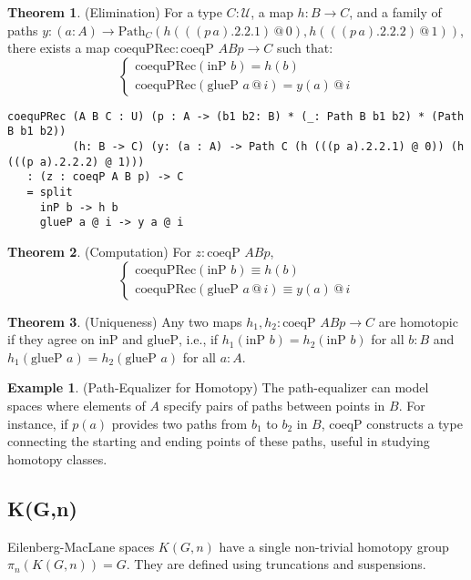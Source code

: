 \documentclass{article}
\theoremstyle{definition}
\newtheorem{theorem}{Theorem}
\newtheorem{example}{Example}
\begin{document}
\begin{theorem} (Elimination)
For a type $C : \mathcal{U}$, a map $h : B \to C$, and a family of paths $y : (a : A) \to \text{Path}_C (h (((p \, a).2.2.1) \, @ \, 0), h (((p \, a).2.2.2) \, @ \, 1))$, there exists a map $\text{coequPRec} : \text{coeqP } A B p \to C$ such that:
\[
\begin{cases}
\text{coequPRec}(\text{inP } b) = h(b) \\
\text{coequPRec}(\text{glueP } a \, @ \, i) = y(a) \, @ \, i
\end{cases}
\]
\begin{lstlisting}
coequPRec (A B C : U) (p : A -> (b1 b2: B) * (_: Path B b1 b2) * (Path B b1 b2))
          (h: B -> C) (y: (a : A) -> Path C (h (((p a).2.2.1) @ 0)) (h (((p a).2.2.2) @ 1)))
   : (z : coeqP A B p) -> C
   = split
     inP b -> h b
     glueP a @ i -> y a @ i
\end{lstlisting}
\end{theorem}

\begin{theorem} (Computation)
For $z : \text{coeqP } A B p$,
\[
\begin{cases}
\text{coequPRec}(\text{inP } b) \equiv h(b) \\
\text{coequPRec}(\text{glueP } a \, @ \, i) \equiv y(a) \, @ \, i
\end{cases}
\]
\end{theorem}

\begin{theorem} (Uniqueness)
Any two maps $h_1, h_2 : \text{coeqP } A B p \to C$ are homotopic if they agree on $\text{inP}$ and $\text{glueP}$, i.e., if $h_1(\text{inP } b) = h_2(\text{inP } b)$ for all $b : B$ and $h_1(\text{glueP } a) = h_2(\text{glueP } a)$ for all $a : A$.
\end{theorem}

\begin{example} (Path-Equalizer for Homotopy)
The path-equalizer can model spaces where elements of $A$ specify pairs of paths between points in $B$. For instance, if $p(a)$ provides two paths from $b_1$ to $b_2$ in $B$, $\text{coeqP}$ constructs a type connecting the starting and ending points of these paths, useful in studying homotopy classes.
\end{example}

\newpage

\subsection{K(G,n)}
Eilenberg-MacLane spaces $K(G,n)$ have a single non-trivial homotopy group $\pi_n(K(G,n)) = G$. They are defined using truncations and suspensions.
\end{document}
